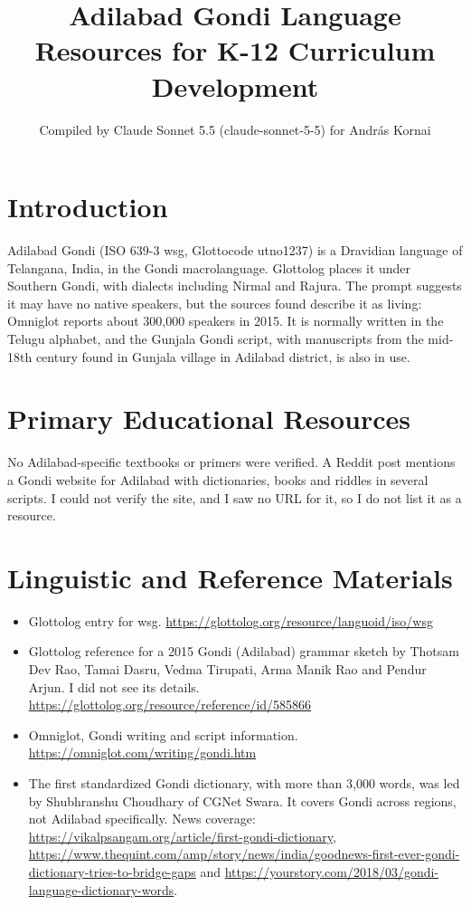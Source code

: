 \documentclass[12pt]{article}
\title{Adilabad Gondi Language Resources for K-12 Curriculum Development}
\author{Compiled by Claude Sonnet 5.5 (claude-sonnet-5-5) for Andr\'as Kornai}
\date{}
\begin{document}
\maketitle

\section{Introduction}
Adilabad Gondi (ISO 639-3 wsg, Glottocode utno1237) is a Dravidian language of Telangana, India, in the Gondi macrolanguage. Glottolog places it under Southern Gondi, with dialects including Nirmal and Rajura. The prompt suggests it may have no native speakers, but the sources found describe it as living: Omniglot reports about 300,000 speakers in 2015. It is normally written in the Telugu alphabet, and the Gunjala Gondi script, with manuscripts from the mid-18th century found in Gunjala village in Adilabad district, is also in use.

\section{Primary Educational Resources}
No Adilabad-specific textbooks or primers were verified. A Reddit post mentions a Gondi website for Adilabad with dictionaries, books and riddles in several scripts. I could not verify the site, and I saw no URL for it, so I do not list it as a resource.

\section{Linguistic and Reference Materials}
\begin{itemize}
\item Glottolog entry for wsg. \url{https://glottolog.org/resource/languoid/iso/wsg}
\item Glottolog reference for a 2015 Gondi (Adilabad) grammar sketch by Thotsam Dev Rao, Tamai Dasru, Vedma Tirupati, Arma Manik Rao and Pendur Arjun. I did not see its details. \url{https://glottolog.org/resource/reference/id/585866}
\item Omniglot, Gondi writing and script information. \url{https://omniglot.com/writing/gondi.htm}
\item The first standardized Gondi dictionary, with more than 3,000 words, was led by Shubhranshu Choudhary of CGNet Swara. It covers Gondi across regions, not Adilabad specifically. News coverage: \url{https://vikalpsangam.org/article/first-gondi-dictionary}, \url{https://www.thequint.com/amp/story/news/india/goodnews-first-ever-gondi-dictionary-tries-to-bridge-gaps} and \url{https://yourstory.com/2018/03/gondi-language-dictionary-words}.
\end{itemize}
\end{document}
